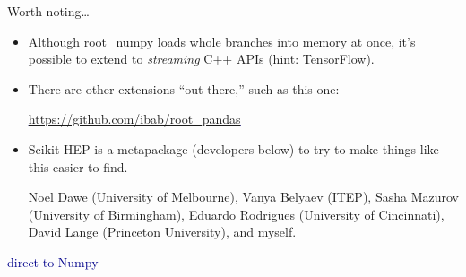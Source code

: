 \documentclass{beamer}
\begin{document}
\begin{frame}{Worth noting\ldots}
\vspace{0.25 cm}
\begin{itemize}\setlength{\itemsep}{0.5 cm}
\item Although root\_numpy loads whole branches into memory at once, it's possible to extend to {\it streaming} C++ APIs (hint: TensorFlow).

\item There are other extensions ``out there,'' such as this one:
\begin{center}
\textcolor{blue}{\underline{\url{https://github.com/ibab/root_pandas}}}
\end{center}

\item Scikit-HEP is a metapackage (developers below) to try to make things like this easier to find.

\footnotesize
\vspace{0.25 cm}
Noel Dawe (University of Melbourne), Vanya Belyaev (ITEP), Sasha Mazurov (University of Birmingham), Eduardo Rodrigues (University of Cincinnati), David Lange (Princeton University), and myself.
\end{itemize}
\end{frame}

\begin{frame}{}
\begin{center}
\LARGE \textcolor{darkblue}{direct to Numpy}
\end{center}
\end{frame}
\end{document}
